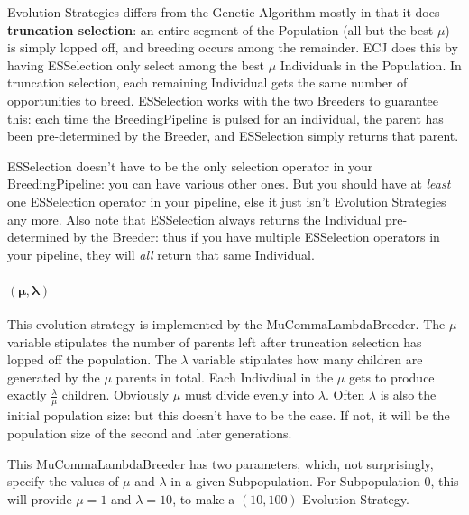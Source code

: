 \documentclass[twoside,10pt]{book}
\begin{document}
Evolution Strategies differs from the Genetic Algorithm mostly in that it does {\bf truncation selection}: an entire segment of the Population (all but the best \(\mu\)) is simply lopped off, and breeding occurs among the remainder.  ECJ does this by having ESSelection only select among the best \(\mu\) Individuals in the Population. In truncation selection, each remaining Individual gets the same number of opportunities to breed.  ESSelection works with the two Breeders to guarantee this: each time the BreedingPipeline is pulsed for an individual, the parent has been pre-determined by the Breeder, and ESSelection simply returns that parent.

ESSelection doesn't have to be the only selection operator in your BreedingPipeline: you can have various other ones.  But you should have at {\it least} one ESSelection operator in your pipeline, else it just isn't Evolution Strategies any more.  Also note that ESSelection always returns the Individual pre-determined by the Breeder: thus if you have multiple ESSelection operators in your pipeline, they will {\it all} return that same Individual.

\paragraph{\(\boldsymbol{(\mu, \lambda)}\)}
This evolution strategy is implemented by the MuCommaLambdaBreeder.  The \(\mu\) variable stipulates the number of parents left after truncation selection has lopped off the population.  The \(\lambda\) variable stipulates how many children are generated by the \(\mu\) parents in total.  Each Indivdiual in the \(\mu\) gets to produce exactly \(\frac{\lambda}{\mu}\) children.  Obviously \(\mu\) must divide evenly into \(\lambda\).  Often \(\lambda\) is also the initial population size: but this doesn't have to be the case.  If not, it will be the population size of the second and later generations.

This MuCommaLambdaBreeder  has two parameters, which, not surprisingly, specify the values of \(\mu\) and \(\lambda\) in a given Subpopulation.  For Subpopulation 0, this will provide \(\mu=1\) and \(\lambda=10\), to make a \((10,100)\) Evolution Strategy.
\end{document}

